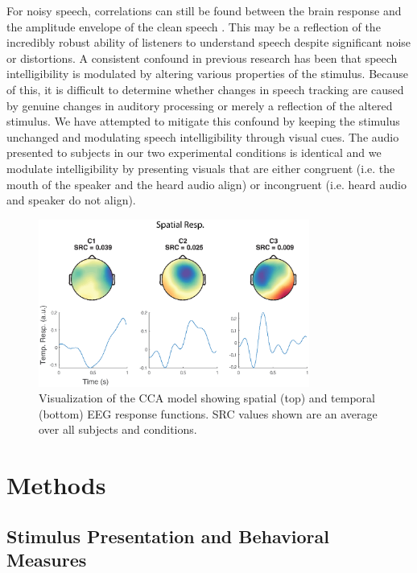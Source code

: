 \documentclass[10pt,letterpaper]{article}
\begin{document}
For noisy speech, correlations can still be found between the brain response 
and the amplitude envelope of the clean speech \cite{Ding2013,Vanthornhout2017}.
This may be a reflection of the incredibly robust ability of listeners to 
understand speech despite significant noise or distortions. A consistent 
confound in previous research has been that speech intelligibility is 
modulated by altering various properties of the stimulus. Because of this,
it is difficult to determine whether changes in speech tracking are 
caused by genuine changes in auditory processing or merely a reflection of the
altered stimulus. We have attempted to mitigate this confound by keeping 
the stimulus unchanged and modulating speech intelligibility through 
visual cues. The audio presented to subjects in our two experimental conditions
is identical and we modulate intelligibility by presenting visuals that 
are either congruent (i.e. the mouth of the speaker and the heard audio align)
or incongruent (i.e. heard audio and speaker do not align).

\begin{figure}[h]
  \begin{center}
    \includegraphics[width=\columnwidth,height=5.5cm]{Figure3a}
  \end{center}
  \caption{Visualization of the CCA model showing spatial (top)
  and temporal (bottom) EEG response functions. SRC values shown
  are an average over all subjects and conditions.}
  \label{srcModel}
\end{figure}



\section{Methods}

\subsection{Stimulus Presentation and Behavioral Measures}
\end{document}
